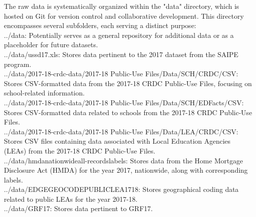 \documentclass[sn-mathphys-num]{sn-jnl}%
\theoremstyle{thmstyleone}%
\theoremstyle{thmstyletwo}%
\theoremstyle{thmstylethree}%
\begin{document}
The raw data is systematically organized within the "data" directory, which is hosted on Git for version control and collaborative development. This directory encompasses several subfolders, each serving a distinct purpose:\\

../data: Potentially serves as a general repository for additional data or as a placeholder for future datasets.\\

../data/ussd17.xls: Stores data pertinent to the 2017 dataset from the SAIPE program.\\

../data/2017-18-crdc-data/2017-18 Public-Use Files/Data/SCH/CRDC/CSV: Stores CSV-formatted data from the 2017-18 CRDC Public-Use Files, focusing on school-related information.\\

../data/2017-18-crdc-data/2017-18 Public-Use Files/Data/SCH/EDFacts/CSV: Stores CSV-formatted data related to schools from the 2017-18 CRDC Public-Use Files.\\

../data/2017-18-crdc-data/2017-18 Public-Use Files/Data/LEA/CRDC/CSV: Stores CSV files containing data associated with Local Education Agencies (LEAs) from the 2017-18 CRDC Public-Use Files.\\

../data/hmda\textunderscore nationwide\textunderscore all-records\textunderscore labels: Stores data from the Home Mortgage Disclosure Act (HMDA) for the year 2017, nationwide, along with corresponding labels.\\

../data/EDGE{\textunderscore}GEOCODE{\textunderscore}PUBLICLEA{\textunderscore}1718: Stores geographical coding data related to public LEAs for the year 2017-18.\\

../data/GRF17: Stores data pertinent to GRF17.\\
\end{document}
